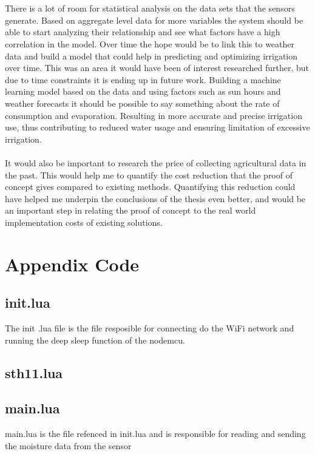 \documentclass[]{uiophd}
\begin{document}
\\\\
There is a lot of room for statistical analysis on the data sets that the sensors generate. Based on aggregate level data for more variables the system should be able to start analyzing their relationship and see what factors have a high correlation in the model. Over time the hope would be to link this to weather data and build a model that could help in predicting and optimizing irrigation over time. This was an area it would have been of interest researched further, but due to time constraints it is ending up in future work. Building a machine learning model based on the data and using factors such as sun hours and weather forecasts it should be possible to say something about the rate of consumption and evaporation. Resulting in more accurate and precise irrigation use, thus contributing to reduced water usage and ensuring limitation of excessive irrigation.
\\\\
It would also be important to research the price of collecting agricultural data in the past. This would help me to quantify the cost reduction that the proof of concept gives compared to existing methods. Quantifying this reduction could have helped me underpin the conclusions of the thesis even better, and would be an important step in relating the proof of concept to the real world implementation costs of existing solutions.

\printbibliography

\chapter*{Appendix Code}
\linespread{1}

\section*{init.lua}
The init .lua file is the file resposible for connecting do the WiFi network and running the deep sleep function of the nodemcu.


\section*{sth11.lua}


\section*{main.lua}
main.lua is the file refenced in init.lua and is responsible for reading and sending the moisture data from the sensor

\end{document}

